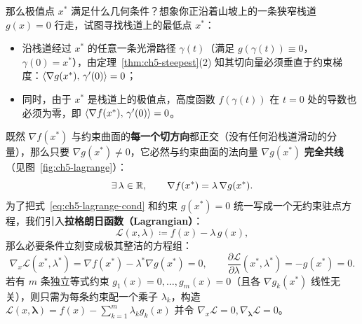 那么极值点 $x^*$ 满足什么几何条件？想象你正沿着山坡上的一条狭窄栈道 $g(x)=0$ 行走，试图寻找栈道上的最低点 $x^*$：
\begin{itemize}
  \item 沿栈道经过 $x^*$ 的任意一条光滑路径 $\gamma(t)$（满足 $g(\gamma(t))\equiv 0$，$\gamma(0)=x^*$），由定理~\ref{thm:ch5-steepest}(2) 知其切向量必须垂直于约束梯度：$\left\langle \nabla g(x^*),\, \gamma'(0) \right\rangle = 0$；
  \item 同时，由于 $x^*$ 是栈道上的极值点，高度函数 $f(\gamma(t))$ 在 $t=0$ 处的导数也必须为零，即 $\left\langle \nabla f(x^*),\, \gamma'(0) \right\rangle = 0$。
\end{itemize}
既然 $\nabla f(x^*)$ 与约束曲面的\textbf{每一个切方向}都正交（没有任何沿栈道滑动的分量），那么只要 $\nabla g(x^*)\neq 0$，它必然与约束曲面的法向量 $\nabla g(x^*)$ \textbf{完全共线}（见图~\ref{fig:ch5-lagrange}）：
\begin{equation}\label{eq:ch5-lagrange-cond}
  \exists\,\lambda\in\mathbb{R}, \qquad \nabla f(x^*) = \lambda\,\nabla g(x^*).
\end{equation}
为了把式~\eqref{eq:ch5-lagrange-cond} 和约束 $g(x^*)=0$ 统一写成一个无约束驻点方程，我们引入\textbf{拉格朗日函数（Lagrangian）}：
\[
  \mathcal{L}(x, \lambda) \coloneqq f(x) - \lambda\, g(x),
\]
那么必要条件立刻变成极其整洁的方程组：
\[
  \nabla_x \mathcal{L}(x^*, \lambda^*) = \nabla f(x^*) - \lambda^*\nabla g(x^*) = 0,
  \qquad
  \frac{\partial \mathcal{L}}{\partial \lambda}(x^*, \lambda^*) = -g(x^*) = 0.
\]
若有 $m$ 条独立等式约束 $g_1(x)=0,\dots,g_m(x)=0$（且各 $\nabla g_k(x^*)$ 线性无关），则只需为每条约束配一个乘子 $\lambda_k$，构造 $\mathcal{L}(x, \boldsymbol{\lambda}) = f(x) - \sum_{k=1}^m \lambda_k g_k(x)$ 并令 $\nabla_x \mathcal{L}=0, \nabla_{\boldsymbol{\lambda}}\mathcal{L}=0$。

